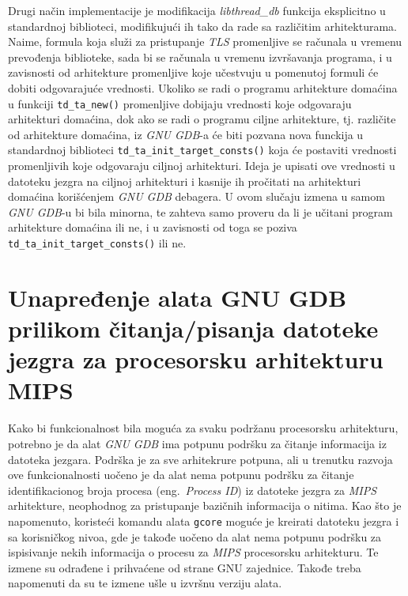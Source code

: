 \documentclass[12pt,oneside]{memoir}
\begin{document}
Drugi način implementacije je modifikacija \emph{libthread\_db} funkcija eksplicitno u standardnoj biblioteci, modifikujući ih tako da rade sa različitim arhitekturama. Naime, formula koja služi za pristupanje \emph{TLS} promenljive se računala u vremenu prevođenja biblioteke, sada bi se računala u vremenu izvršavanja programa, i u zavisnosti od arhitekture promenljive koje učestvuju u pomenutoj formuli će dobiti odgovarajuće vrednosti. Ukoliko se radi o programu arhitekture domaćina u funkciji  \texttt{td\_ta\_new()} promenljive dobijaju vrednosti koje odgovaraju arhitekturi domaćina, dok ako se radi o programu ciljne arhitekture, tj. različite od arhitekture domaćina, iz \emph{GNU GDB}-a će biti pozvana nova funckija u standardnoj biblioteci \texttt{td\_ta\_init\_target\_consts()} koja će postaviti vrednosti promenljivih koje odgovaraju ciljnoj arhitekturi. Ideja je upisati ove vrednosti u datoteku jezgra na ciljnoj arhitekturi i kasnije ih pročitati na arhitekturi domaćina korišćenjem \emph{GNU GDB} debagera. U ovom slučaju izmena u samom \emph{GNU GDB}-u bi bila minorna, te zahteva samo proveru da li je učitani program arhitekture domaćina ili ne, i u zavisnosti od toga se poziva \texttt{td\_ta\_init\_target\_consts()} ili ne.

\section{Unapređenje alata GNU GDB prilikom čitanja/pisanja datoteke jezgra za procesorsku arhitekturu MIPS}

Kako bi funkcionalnost bila moguća za svaku podržanu procesorsku arhitekturu, potrebno je da alat \emph{GNU GDB} ima potpunu podršku za čitanje informacija iz datoteka jezgara. Podrška je za sve arhitekrure potpuna, ali u trenutku razvoja ove funkcionalnosti uočeno je da alat nema potpunu podršku za čitanje identifikacionog broja procesa (eng.~\emph{Process ID}) iz datoteke jezgra za \emph{MIPS} arhitekture, neophodnog za pristupanje bazičnih informacija o nitima. Kao što je napomenuto, koristeći komandu alata \texttt{gcore} moguće je kreirati datoteku jezgra i sa korisničkog nivoa, gde je takođe uočeno da alat nema potpunu podršku za ispisivanje nekih informacija o procesu za \emph{MIPS} procesorsku arhitekturu. Te izmene su odrađene i prihvaćene od strane GNU zajednice. Takođe treba napomenuti da su te izmene ušle u izvršnu verziju alata.
\end{document}
